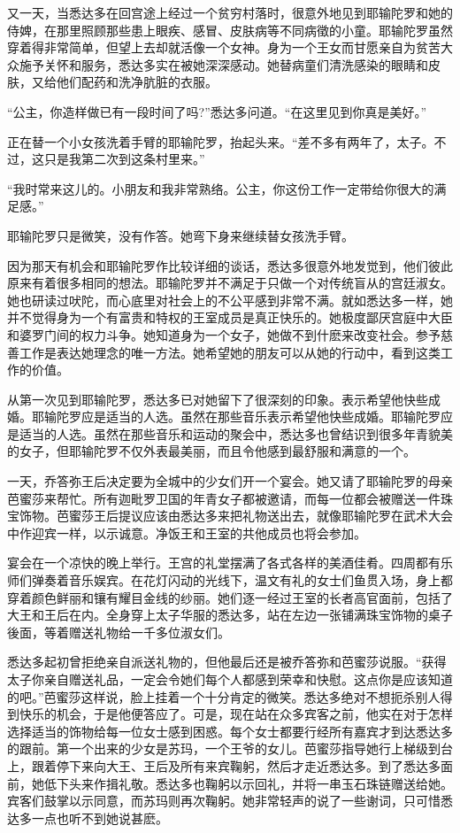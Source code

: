 \documentclass[12pt,twoside,openany]{book}
\begin{document}
又一天，当悉达多在回宫途上经过一个贫穷村落时，很意外地见到耶输陀罗和她的侍婢，在那里照顾那些患上眼疾、感冒、皮肤病等不同病徵的小童。耶输陀罗虽然穿着得非常简单，但望上去却就活像一个女神。身为一个王女而甘愿亲自为贫苦大众施予关怀和服务，悉达多实在被她深深感动。她替病童们清洗感染的眼睛和皮肤，又给他们配药和洗净肮脏的衣服。

“公主，你造样做已有一段时间了吗?”悉达多问道。“在这里见到你真是美好。”

正在替一个小女孩洗着手臂的耶输陀罗，抬起头来。“差不多有两年了，太子。不过，这只是我第二次到这条村里来。”

“我时常来这儿的。小朋友和我非常熟络。公主，你这份工作一定带给你很大的满足感。”

耶输陀罗只是微笑，没有作答。她弯下身来继续替女孩洗手臂。

因为那天有机会和耶输陀罗作比较详细的谈话，悉达多很意外地发觉到，他们彼此原来有着很多相同的想法。耶输陀罗并不满足于只做一个对传统盲从的宫廷淑女。她也研读过吠陀，而心底里对社会上的不公平感到非常不满。就如悉达多一样，她并不觉得身为一个有富贵和特权的王室成员是真正快乐的。她极度鄙厌宫庭中大臣和婆罗门间的权力斗争。她知道身为一个女子，她做不到什麽来改变社会。参予慈善工作是表达她理念的唯一方法。她希望她的朋友可以从她的行动中，看到这类工作的价值。

从第一次见到耶输陀罗，悉达多已对她留下了很深刻的印象。表示希望他快些成婚。耶输陀罗应是适当的人选。虽然在那些音乐表示希望他快些成婚。耶输陀罗应是适当的人选。虽然在那些音乐和运动的聚会中，悉达多也曾结识到很多年青貌美的女子，但耶输陀罗不仅外表最美丽，而且令他感到最舒服和满意的一个。

一天，乔答弥王后决定要为全城中的少女们开一个宴会。她又请了耶输陀罗的母亲芭蜜莎来帮忙。所有迦毗罗卫国的年青女子都被邀请，而每一位都会被赠送一件珠宝饰物。芭蜜莎王后提议应该由悉达多来把礼物送出去，就像耶输陀罗在武术大会中作迎宾一样，以示诚意。净饭王和王室的共他成员也将会参加。

宴会在一个凉快的晚上举行。王宫的礼堂摆满了各式各样的美酒佳肴。四周都有乐师们弹奏着音乐娱宾。在花灯闪动的光线下，温文有礼的女士们鱼贯入场，身上都穿着颜色鲜丽和镶有耀目金线的纱丽。她们逐一经过王室的长者高官面前，包括了大王和王后在内。全身穿上太子华服的悉达多，站在左边一张铺满珠宝饰物的桌子後面，等着赠送礼物给一千多位淑女们。

悉达多起初曾拒绝亲自派送礼物的，但他最后还是被乔答弥和芭蜜莎说服。“获得太子你亲自赠送礼品，一定会令她们每个人都感到荣幸和快慰。这点你是应该知道的吧。”芭蜜莎这样说，脸上挂着一个十分肯定的微笑。悉达多绝对不想扼杀别人得到快乐的机会，于是他便答应了。可是，现在站在众多宾客之前，他实在对于怎样选择适当的饰物给每一位女士感到困惑。每个女士都要行经所有嘉宾才到达悉达多的跟前。第一个出来的少女是苏玛，一个王爷的女儿。芭蜜莎指导她行上梯级到台上，跟着停下来向大王、王后及所有来宾鞠躬，然后才走近悉达多。到了悉达多面前，她低下头来作揖礼敬。悉达多也鞠躬以示回礼，并将一串玉石珠链赠送给她。宾客们鼓掌以示同意，而苏玛则再次鞠躬。她非常轻声的说了一些谢词，只可惜悉达多一点也听不到她说甚麽。
\end{document}
